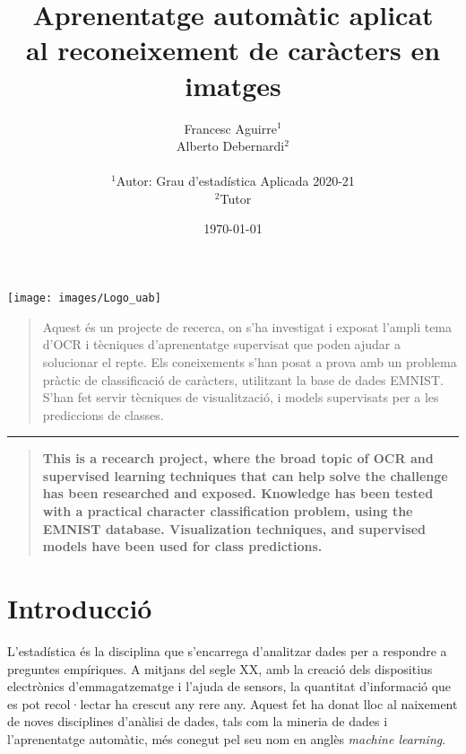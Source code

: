 \documentclass[12pt, spanish]{article}
\title{Aprenentatge automàtic aplicat \\ al reconeixement de caràcters en imatges}
\author
{\large{Francesc Aguirre$^{1}$} \\
 \small{Alberto Debernardi$^{2}$}\\
\\
\normalsize{$^{1}$Autor: Grau d'estadística Aplicada 2020-21}\\
\normalsize{$^{2}$Tutor}\\
}
\date{\today}
\newenvironment{sciabstract}{%
\begin{quote} \bf}
{\end{quote}}
\begin{document}
 

\baselineskip24pt

\maketitle 

\baselineskip24pt

\begin{center}
	\texttt{[image: images/Logo\_uab]}\par\vspace{1cm}
\end{center}

\clearpage



\begin{sciabstract}

Aquest és un projecte de recerca, on s'ha investigat i exposat l'ampli tema d'OCR i tècniques d'aprenentatge supervisat que poden ajudar a solucionar el repte. Els coneixements s'han posat a prova amb un problema pràctic de classificació de caràcters, utilitzant la base de dades EMNIST. S'han fet servir tècniques de visualització, i models supervisats per a les prediccions de classes.

\end{sciabstract}

\noindent\rule{16cm}{0.4pt}

\begin{sciabstract}
This is a recearch project, where the broad topic of OCR and supervised learning techniques that can help solve the challenge has been researched and exposed. Knowledge has been tested with a practical character classification problem, using the EMNIST database. Visualization techniques, and supervised models have been used for class predictions.
\end{sciabstract}

\clearpage

\tableofcontents

\clearpage

\section{Introducció}

L'estadística és la disciplina que s'encarrega d'analitzar dades per a respondre a preguntes empíriques. A mitjans del segle XX, amb la creació dels dispositius electrònics d'emmagatze\-matge i l'ajuda de sensors, la quantitat d'informació que es pot recol·lectar ha crescut any rere any. Aquest fet ha donat lloc al naixement de noves disciplines d'anàlisi de dades, tals com la mineria de dades i l'aprenentatge automàtic, més conegut pel seu nom en anglès \textit{machine learning}.
\end{document}
